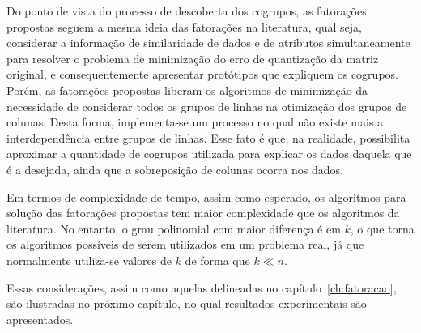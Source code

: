 \documentclass[
    12pt,                %
    oneside,            %
    a4paper,            %
    english,            %
    brazil                %
    ]{abntex2ppgsi}
\begin{document}
Do ponto de vista do processo de descoberta dos cogrupos, as fatorações propostas seguem a mesma ideia das fatorações na literatura, qual seja, considerar a informação de similaridade de dados e de atributos simultaneamente para resolver o problema de minimização do erro de quantização da matriz original, e consequentemente apresentar protótipos que expliquem os cogrupos.
Porém, as fatorações propostas liberam os algoritmos de minimização da necessidade de considerar todos os grupos de linhas na otimização dos grupos de colunas.
Desta forma, implementa-se um processo no qual não existe mais a interdependência entre grupos de linhas.
Esse fato é que, na realidade, possibilita aproximar a quantidade de cogrupos utilizada para explicar os dados daquela que é a desejada, ainda que a sobreposição de colunas ocorra nos dados.

Em termos de complexidade de tempo, assim como esperado, os algoritmos para solução das fatorações propostas tem maior complexidade que os algoritmos da literatura.
No entanto, o grau polinomial com maior diferença é em $k$, o que torna os algoritmos possíveis de serem utilizados em um problema real, já que normalmente utiliza-se valores de $k$ de forma que $k \ll n$.

Essas considerações, assim como aquelas delineadas no capítulo~\ref{ch:fatoracao}, são ilustradas no próximo capítulo, no qual resultados experimentais são apresentados.



\end{document}
